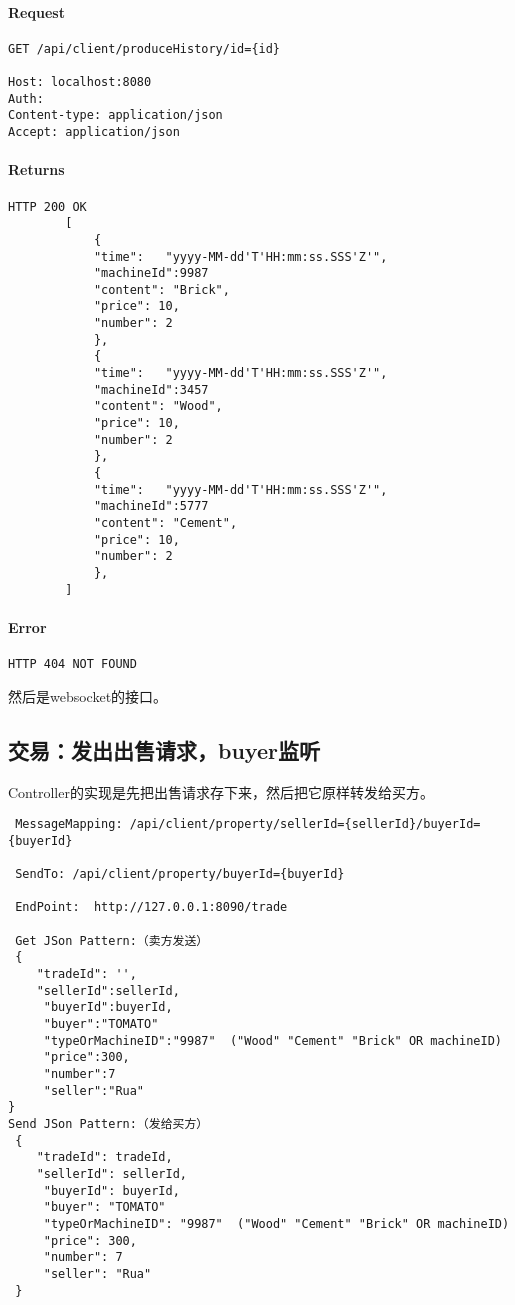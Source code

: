\documentclass{article}
\begin{document}
					\paragraph*{Request}
\begin{lstlisting}
GET /api/client/produceHistory/id={id}

Host: localhost:8080
Auth:
Content-type: application/json
Accept: application/json
\end{lstlisting}
					\paragraph*{Returns}
\begin{lstlisting}
HTTP 200 OK
        [
            {
            "time":   "yyyy-MM-dd'T'HH:mm:ss.SSS'Z'",
            "machineId":9987
            "content": "Brick",
            "price": 10,
            "number": 2
            },
            {
            "time":   "yyyy-MM-dd'T'HH:mm:ss.SSS'Z'",
            "machineId":3457
            "content": "Wood",
            "price": 10,
            "number": 2
            },
            {
            "time":   "yyyy-MM-dd'T'HH:mm:ss.SSS'Z'",
            "machineId":5777
            "content": "Cement",
            "price": 10,
            "number": 2
            },
        ]\end{lstlisting}
					\paragraph*{Error}
\begin{lstlisting}
HTTP 404 NOT FOUND
\end{lstlisting}

		然后是websocket的接口。

				\subsection{交易：发出出售请求，buyer监听}
                Controller的实现是先把出售请求存下来，然后把它原样转发给买方。

\begin{lstlisting}
 MessageMapping: /api/client/property/sellerId={sellerId}/buyerId={buyerId}

 SendTo: /api/client/property/buyerId={buyerId}

 EndPoint:  http://127.0.0.1:8090/trade

 Get JSon Pattern:（卖方发送）
 {
    "tradeId": '',
    "sellerId":sellerId,
     "buyerId":buyerId,
     "buyer":"TOMATO"
     "typeOrMachineID":"9987"  ("Wood" "Cement" "Brick" OR machineID)
     "price":300,
     "number":7
     "seller":"Rua"
}
Send JSon Pattern:（发给买方）
 {
    "tradeId": tradeId,
    "sellerId": sellerId,
     "buyerId": buyerId,
     "buyer": "TOMATO"
     "typeOrMachineID": "9987"  ("Wood" "Cement" "Brick" OR machineID)
     "price": 300,
     "number": 7
     "seller": "Rua"
 }

\end{lstlisting}
\end{document}
